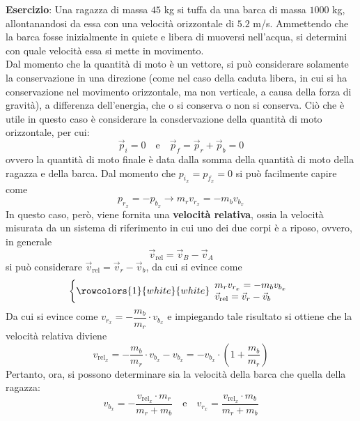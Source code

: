 \documentclass[a4paper]{extarticle}
\begin{document}
\vspace{1em}
\noindent
\textbf{Esercizio}: Una ragazza di massa $45$ kg si tuffa da una barca di massa $1000$ kg, allontanandosi da essa con una velocità orizzontale di $5.2$ m/s. Ammettendo che la barca fosse inizialmente in quiete e libera di muoversi nell'acqua, si determini con quale velocità essa si mette in movimento.\\
Dal momento che la quantità di moto è un vettore, si può considerare solamente la conservazione in una direzione (come nel caso della caduta libera, in cui si ha conservazione nel movimento orizzontale, ma non verticale, a causa della forza di gravità), a differenza dell'energia, che o si conserva o non si conserva. Ciò che è utile in questo caso è considerare la consdervazione della quantità di moto orizzontale, per cui:
\[\vec p_i=0 \hspace{1em} \text{e} \hspace{1em} \vec p_f=\vec p_r + \vec p_b=0\]
ovvero la quantità di moto finale è data dalla somma della quantità di moto della ragazza e della barca. Dal momento che $p_{i_x}=p_{f_x}=0$ si può facilmente capire come
\[p_{r_x}=-p_{b_x} \longrightarrow m_r v_{r_x} = -m_{b} v_{b_x}\]
In questo caso, però, viene fornita una \textbf{velocità relativa}, ossia la velocità misurata da un sistema di riferimento in cui uno dei due corpi è a riposo, ovvero, in generale
\[\boxed{\vec v_{\text{rel}} = \vec v_B - \vec v_A}\]
si può considerare $\vec v_{\text{rel}} = \vec v_r - \vec v_b$, da cui si evince come
\[
  \left\{
  \rowcolors{1}{white}{white}
  \begin{array}{l}
    m_r v_{r_x} = -m_b v_{b_x}\\
    \vec v_{\text{rel}} = \vec v_r - \vec v_b
  \end{array}
  \right.
\]
Da cui si evince come $v_{r_x}=-\dfrac{m_b}{m_r} \cdot v_{b_x}$ e impiegando tale risultato si ottiene che la velocità relativa diviene
\[v_{\text{rel}_x} = -\frac{m_b}{m_r} \cdot v_{b_x} - v_{b_x} = -v_{b_x} \cdot \left(1+\frac{m_b}{m_r}\right)\]
Pertanto, ora, si possono determinare sia la velocità della barca che quella della ragazza:
\[v_{b_x}=-\frac{v_{\text{rel}_x} \cdot m_r}{m_r+m_b} \hspace{1em} \text{e} \hspace{1em} v_{r_x}=\frac{v_{\text{rel}_x} \cdot m_b}{m_r+m_b}\]

\vspace{1em}
\end{document}
